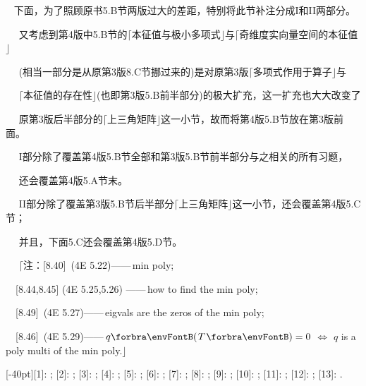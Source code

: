 {\Comment\,\,\, 下面，为了照顾原书{\tgbf 5.B}节两版过大的差距，特别将此节补注分成{\tgbf I}和{\tgbf II}两部分。\par\qquad\qquad\,\,\,\,\,\,
又考虑到第4版中{\tgbf 5.B}节的$\lceil$本征值与极小多项式$\rfloor$与$\lceil$奇维度实向量空间的本征值$\rfloor$\par\qquad\qquad\,\,\,\,\,\,
(相当一部分是从原第3版{\tgbf 8.C}节挪过来的)是对原第3版$\lceil$多项式作用于算子$\rfloor$与\par\qquad\qquad\,\,\,\,\,\,
$\lceil$本征值的存在性$\rfloor$(也即第3版{\tgbf 5.B}前半部分)的极大扩充，这一扩充也大大改变了\par\qquad\qquad\,\,\,\,\,\,
原第3版后半部分的$\lceil$上三角矩阵$\rfloor$这一小节，故而将第4版{\tgbf 5.B}节放在第3版前面。{\par}\qquad\qquad\,\,\,\,\,\,
{\tgbf I}部分除了覆盖第4版{\tgbf 5.B}节全部和第3版{\tgbf 5.B}节前半部分与之相关的所有习题，{\Large\par}\qquad\qquad\,\,\,\,\,\,
还会覆盖第4版{\tgbf 5.A}节末。\par\qquad\qquad\,\,\,\,\,\,
{\tgbf II}部分除了覆盖第3版5.B节后半部分$\lceil$上三角矩阵$\rfloor$这一小节，还会覆盖第4版{\tgbf 5.C}节；\par\qquad\qquad\,\,\,\,\,\,
并且，下面{\tgbf 5.C}还会覆盖第4版{\tgbf 5.D}节。\par\qquad\qquad\,\,\,\,\,\,
$\lceil$注：[8.40]\qquad\, \OR (4E 5.22)\qquad ——\,min poly;\par\qquad\qquad\qquad\quad\,\,\,\,
[8.44,8.45] \OR (4E 5.25,5.26) ——\,how to find the min poly;\par\qquad\qquad\qquad\quad\,\,\,\,
[8.49]\qquad\, \OR (4E 5.27)\qquad ——\,eigvals are the zeros of the min poly;\par\qquad\qquad\qquad\quad\,\,\,\,
[8.46]\qquad\, \OR (4E 5.29)\qquad ——\,$q\Par{T} = 0$ $\Leftrightarrow$ $q$ is a poly multi of the min poly.$\rfloor$
}\par\large


[-40pt]{[1]: ; [2]: ; [3]: ; [4]: ; [5]: ; [6]: ; [7]: ; [8]: ; [9]: ; [10]: ; [11]: ; [12]: ; [13]: .}

